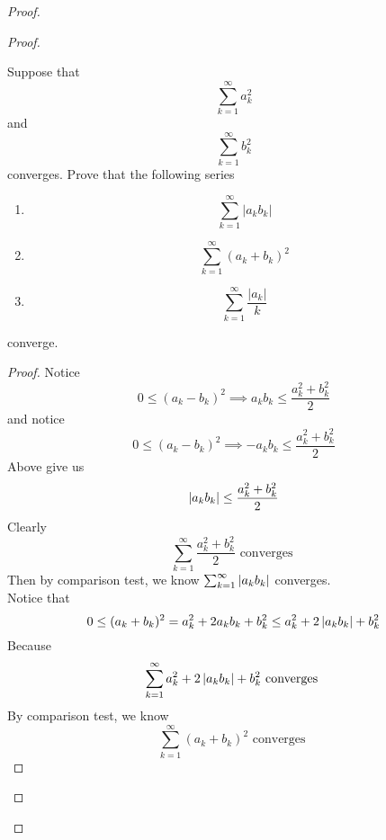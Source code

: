\documentclass{report}
\begin{document}
\begin{proof}
\begin{proof}
\begin{question}{}{}
Suppose that 
\[
\sum_{k=1}^{\infty} a_k^2
\]
and 
\[
\sum_{k=1}^{\infty} b_k^2
\]
converges. Prove that the following series
\begin{enumerate}
    \item \[
    \sum_{k=1}^{\infty} |a_kb_k|
    \]
    \item \[
    \sum_{k=1}^{\infty} (a_k + b_k)^2
    \]
    \item \[
    \sum_{k=1}^{\infty} \frac{|a_k|}{k}
    \]
\end{enumerate}
converge.
\end{question}
\begin{proof}
Notice 
\begin{equation}
0\leq (a_k-b_k)^{2}\implies a_kb_k\leq \frac{a_k^2+b_k^2}{2}
\end{equation}
and notice
\begin{equation}
0\leq (a_k-b_k)^2\implies -a_kb_k\leq \frac{a_k^2+b_k^2}{2}
\end{equation}
Above give us
\begin{equation}
\left|a_kb_k\right|\leq \frac{a_k^2+b_k^2}{2}
\end{equation}
Clearly
\begin{equation}
\sum_{k=1}^\infty \frac{a_k^2+b_k^2}{2}\text{ converges }
\end{equation}
Then by comparison test, we know $\sum_{k=1}^\infty \left|a_kb_k\right|$ converges.\\

Notice that
\begin{equation}
  0\leq (a_k+b_k)^2=a_k^2 +2a_kb_k+b_k^2 \leq a_k^2+2\left|a_kb_k\right|+b_k^2 
\end{equation}
Because 
\begin{equation}
\sum_{k=1}^\infty a_k^2 +2\left|a_kb_k\right|+b_k^2\text{ converges }
\end{equation}
By comparison test, we know 
\begin{equation}
\sum_{k=1}^\infty (a_k+b_k)^2 \text{ converges }
\end{equation}
\end{proof}


\end{proof}
\end{proof}
\end{document}
